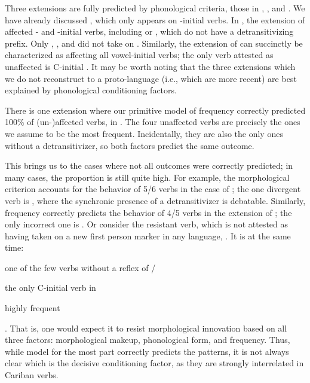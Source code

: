 Three extensions are fully predicted by phonological criteria, those in \akuriyo, \carijo, and \yukpa.
We have already discussed \akuriyo {} , which only appears on -initial verbs.
In \carijo, the extension of  affected - and -initial verbs, including   or  , which do not have a detransitivizing prefix.
Only  ,  , and   did not take on .
Similarly, the extension of \yukpa {} can succinctly be characterized as affecting all vowel-initial verbs; the only verb attested as unaffected is C-initial  .
It may be worth noting that the three extensions which we do not reconstruct to a proto-language (i.e., which are more recent) are best explained by phonological conditioning factors.

There is one extension where our primitive model of frequency correctly predicted 100\% of (un-){}affected verbs, in \PWai.
The four unaffected  verbs are precisely the ones we assume to be the most frequent.
Incidentally, they are also the only ones without a detransitivizer, so both factors predict the same outcome.

This brings us to the cases where not all outcomes were correctly predicted; in many cases, the proportion is still quite high.
For example, the morphological criterion accounts for the behavior of 5/6 verbs in the case of \PTir; the one divergent verb is  , where the synchronic presence of a detransitivizer is debatable.
Similarly, frequency correctly predicts the behavior of 4/5 verbs in the extension of \carijo {}; the only incorrect one is  .
Or consider the  resistant verb, which is not attested as having taken on a new first person marker in any language,  .
It is at the same time: \begin{inlinelist}
	\item one of the few  verbs without a reflex of /
	\item the only C-initial  verb in \PC
	\item highly frequent
\end{inlinelist}.
That is, one would expect it to resist morphological innovation based on all three factors: morphological makeup, phonological form, and frequency.
Thus, while  model for the most part correctly predicts the patterns, it is not always clear which is the decisive conditioning factor, as they are strongly interrelated in Cariban  verbs.



